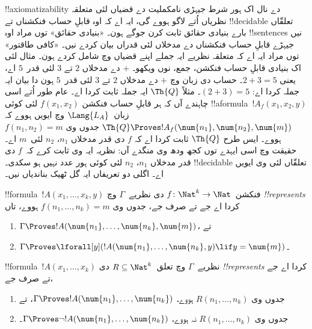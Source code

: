 \documentclass[../../../include/open-logic-section]{subfiles}
\begin{document}
!!{axiomatizability}
دے نال
اک ہور
شرط جیہڑی
نامکملیت
دے قضیاں
لئی متعلقہ
نظریاں اُتے
لاگو ہووے
گی، ایہ
اے کہ اوہ
قابلِ حساب
فنکشناں
تے
!!{decidable}
تعلقّاں بارے
بنیادی حقائق
ثابت کرن
جوگے ہون۔
«بنیادی
حقائق»
توں مراد
اوہ
!!{sentence}s
نیں جیہڑے
قابلِ حساب
فنکشناں
دے
مدخلاں
لئی قدراں
بیان کردے
نیں۔
«کافی طاقتور»
توں مراد
ایہ اے
کہ متعلقہ
نظریے
ایہ جملے
اپنے قضیاں
وچ شامل
کردے ہون۔
مثال لئی
اک بنیادی
قابلِ حساب
فنکشن، جمع،
نوں ویکھو۔
$+$ دے
مدخلاں
$2$ تے
$3$ لئی
قدر~$5$
اے، یعنی
$2+3 = 5$۔
حساب دی
زبان وچ
$+$ دے
مدخلاں
$2$ تے
$3$ لئی
قدر~$5$
ہون دا
بیان ایہ
جملہ کردا اے:
$(\num{2} + \num{3}) = \num{5}$۔
مثلاً
$\Th{Q}$
ایہ جملہ
ثابت کردا
اے۔ عام
طور اُتے
اسی چاہندے
آں کہ
ہر قابلِ
حساب فنکشن
$f(x_1, x_2)$
لئی کوئی
!!a{formula}~$!A_f(x_1, x_2, y)$
زبان~$\Lang{L_A}$
وچ ایویں ہووے کہ
$\Th{Q}
\Proves !A_f(\num{n_1}, \num{n_2}, \num{m})$
جدوں وی
$f(n_1, n_2) =
m$ ہووے۔
ایس طرح
$\Th{Q}$
ثابت کردا
اے کہ
$f$ دی
قدر مدخلاں
$n_1$،
$n_2$
لئی~$m$
اے۔ حقیقت
وچ اسی
ایہدے توں
کجھ ودھ
وی منگدے
آں: نظریہ
ایہ وی
ثابت کرے
کہ~$f$ دی
قدر مدخلاں
$n_1$،
$n_2$ لئی
کوئی
ہور عدد
نہیں ہو
سکدی۔
!!{decidable}
تعلقّاں
لئی وی
ایویں
اے۔ اگلی
دو تعریفاں
ایہ گل
ٹھیک
بناندیاں
نیں۔

\begin{defn}
!!{formula}~$!A(x_1, \dots, x_k, y)$
فنکشن~$f\colon \Nat^k \to \Nat$
دی نظریے~$\Gamma$ وچ
\emph{!!{represents}} کردا اے
جے تے
صرف جے،
جدوں وی
$f(n_1,
\dots, n_k) = m$
ہووے، تاں
\begin{enumerate}
\item $\Gamma \Proves !A(\num{n_1}, \dots, \num{n_k}, \num{m})$، تے
\item $\Gamma \Proves \lforall[y](!A(\num{n_1}, \dots, \num{n_k},
y) \lif y = \num{m})$۔
\end{enumerate}
\end{defn}

\begin{defn}
!!{formula}~$!A(x_1, \dots, x_k)$
نظریے~$\Gamma$ وچ
تعلق~$R \subseteq \Nat^k$
دی \emph{!!{represents}} کردا اے
جے تے
صرف جے،
\begin{enumerate}
\item جدوں وی $R(n_1, \dots, n_k)$ ہووے،
  $\Gamma \Proves !A(\num{n_1},
\dots, \num{n_k})$، تے
\item جدوں وی $R(n_1, \dots, n_k)$ نہ ہووے،
  $\Gamma \Proves \lnot
!A(\num{n_1}, \dots, \num{n_k})$۔
\end{enumerate}
\end{defn}
\end{document}
